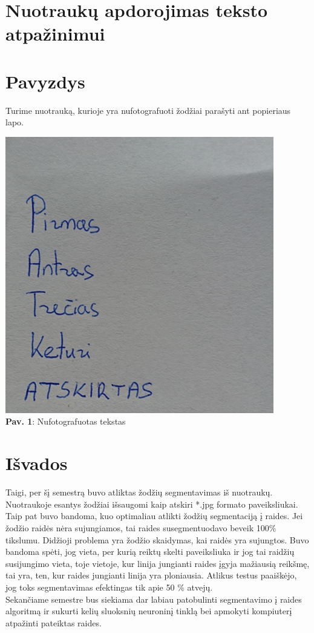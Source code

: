 \documentclass[a4paper,12pt]{article}
\begin{document}
\newpage
\section{Nuotraukų apdorojimas teksto atpažinimui}


\newpage
\section{Pavyzdys}
Turime nuotrauką, kurioje yra nufotografuoti žodžiai parašyti ant popieriaus lapo.
\begin{center}
	\includegraphics[scale=0.75]{img/1.png}\\
	\textbf{Pav. 1}: Nufotografuotas tekstas\\
\end{center}


\newpage
\section*{Išvados}
Taigi, per šį semestrą buvo atliktas žodžių segmentavimas iš nuotraukų. Nuotraukoje esantys žodžiai išsaugomi kaip atskiri *.jpg formato paveiksliukai. Taip pat buvo bandoma, kuo optimaliau atlikti žodžių segmentaciją į raides. Jei žodžio raidės nėra sujungiamos, tai raides susegmentuodavo beveik 100\% tikslumu. Didžioji problema yra žodžio skaidymas, kai raidės yra sujungtos. Buvo bandoma spėti, jog vieta, per kurią reiktų skelti paveiksliuka ir jog tai raidžių susijungimo vieta, toje vietoje, kur linija jungianti raides įgyja mažiausią reikšmę, tai yra, ten, kur raides jungianti linija yra ploniausia. Atlikus testus paaiškėjo, jog toks segmentavimas efektingas tik apie 50 \% atvejų.\\
\indent Sekančiame semestre bus siekiama dar labiau patobulinti segmentavimo į raides algoritmą ir sukurti kelių sluoksnių neuroninį tinklą bei apmokyti kompiuterį atpažinti pateiktas raides.
\end{document}
